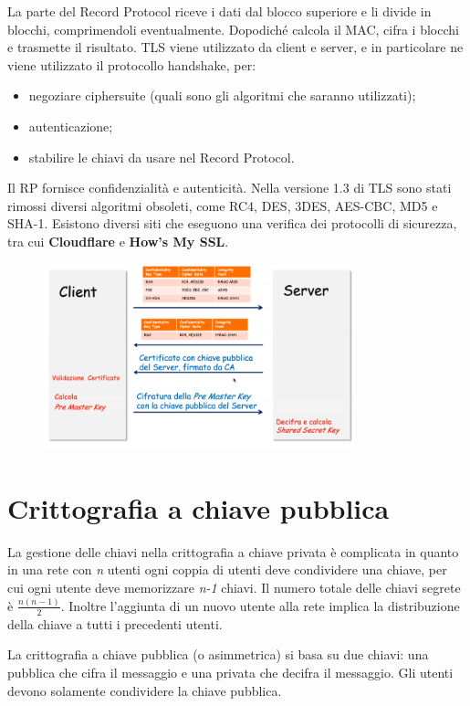 La parte del Record Protocol riceve i dati dal blocco superiore e li divide in blocchi, comprimendoli eventualmente. Dopodiché calcola il MAC, cifra i blocchi e trasmette il risultato. TLS viene utilizzato da client e server, e in particolare ne viene utilizzato il protocollo handshake, per:
\begin{itemize}
    \item negoziare ciphersuite (quali sono gli algoritmi che saranno utilizzati);
    \item autenticazione;
    \item stabilire le chiavi da usare nel Record Protocol.
\end{itemize}
Il RP fornisce confidenzialità e autenticità. Nella versione 1.3 di TLS sono stati rimossi diversi algoritmi obsoleti, come RC4, DES, 3DES, AES-CBC, MD5 e SHA-1. Esistono diversi siti che eseguono una verifica dei protocolli di sicurezza, tra cui \textbf{Cloudflare} e \textbf{How's My SSL}. 

\begin{figure}[htb!]
    \centering
    \includegraphics[width=9cm]{./Images/cap1/1.42.png}
\end{figure} 

\section{Crittografia a chiave pubblica}
La gestione delle chiavi nella crittografia a chiave privata è complicata in quanto in una rete con \textit{n} utenti ogni coppia di utenti deve condividere una chiave, per cui ogni utente deve memorizzare \textit{n-1} chiavi. Il numero totale delle chiavi segrete è $\frac{n(n-1)}{2}$. Inoltre l'aggiunta di un nuovo utente alla rete implica la distribuzione della chiave a tutti i precedenti utenti.

La crittografia a chiave pubblica (o asimmetrica) si basa su due chiavi: una pubblica che cifra il messaggio e una privata che decifra il messaggio. Gli utenti devono solamente condividere la chiave pubblica.

